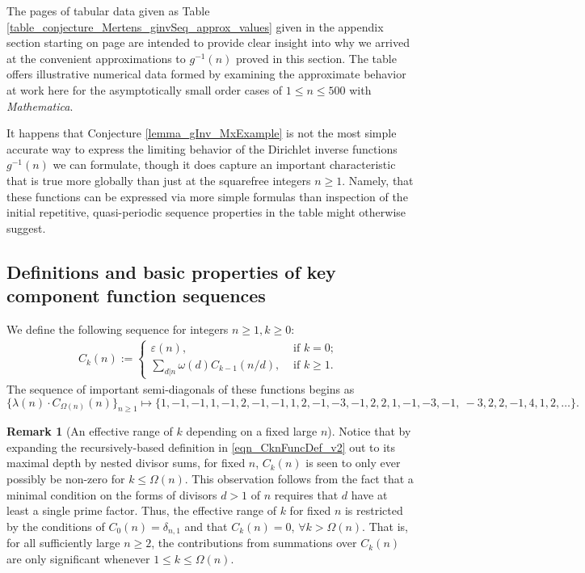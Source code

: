 \documentclass[11pt,reqno,a4letter]{article}
\numberwithin{figure}{section}
\numberwithin{table}{section}
\newcommand{\seqnum}[1]{\href{http://oeis.org/#1}{\color{ProcessBlue}{\underline{#1}}}}
\theoremstyle{plain}
\numberwithin{theorem}{section}
\theoremstyle{definition}
\newtheorem{remark}[theorem]{Remark}
\begin{document}
The pages of tabular data given as Table \ref{table_conjecture_Mertens_ginvSeq_approx_values} 
given in the appendix section starting on 
page \pageref{table_conjecture_Mertens_ginvSeq_approx_values} are intended to 
provide clear insight into why we arrived at the convenient approximations to 
$g^{-1}(n)$ proved in this section. The table offers illustrative 
numerical data formed by examining the approximate behavior 
at work here for the asymptotically 
small order cases of $1 \leq n \leq 500$ with \emph{Mathematica}. 

It happens that Conjecture \ref{lemma_gInv_MxExample} is not the most 
simple accurate way to express the limiting behavior of the 
Dirichlet inverse functions $g^{-1}(n)$ we can formulate, 
though it does capture an important characteristic that is true more globally than just at the 
squarefree integers $n \geq 1$. Namely, that these 
functions can be expressed via more simple formulas than inspection of the initial 
repetitive, quasi-periodic sequence properties in the table might otherwise suggest. 

\subsection{Definitions and basic properties of key component function sequences} 

We define the following sequence for integers $n \geq 1, k \geq 0$: 
\begin{align} 
\label{eqn_CknFuncDef_v2} 
C_k(n) := \begin{cases} 
     \varepsilon(n), & \text{ if $k = 0$; } \\ 
     \sum\limits_{d|n} \omega(d) C_{k-1}(n/d), & \text{ if $k \geq 1$. } 
     \end{cases} 
\end{align} 
The sequence of important semi-diagonals of these functions begins as 
\cite[\seqnum{A008480}]{OEIS} 
\[
\{\lambda(n) \cdot C_{\Omega(n)}(n) \}_{n \geq 1} \mapsto \{
     1, -1, -1, 1, -1, 2, -1, -1, 1, 2, -1, -3, -1, 2, 2, 1, -1, -3, -1, \
     -3, 2, 2, -1, 4, 1, 2, \ldots \}. 
\]

\begin{remark}[An effective range of $k$ depending on a fixed large $n$]
Notice that by expanding the recursively-based definition in \eqref{eqn_CknFuncDef_v2} 
out to its maximal depth by nested divisor sums, for fixed $n$, $C_k(n)$ is seen to 
only ever possibly be non-zero for $k \leq \Omega(n)$. 
This observation follows from the fact that 
a minimal condition on the forms of 
divisors $d > 1$ of $n$ requires that $d$ have at least a single prime factor. 
Thus, the effective range of $k$ for fixed $n$ is restricted by the 
conditions of $C_0(n) = \delta_{n,1}$ and that $C_k(n) = 0$, $\forall k > \Omega(n)$. 
That is, for all sufficiently large $n \geq 2$, the contributions from 
summations over $C_k(n)$ are only significant whenever $1 \leq k \leq \Omega(n)$. 
\end{remark} 
\end{document}
